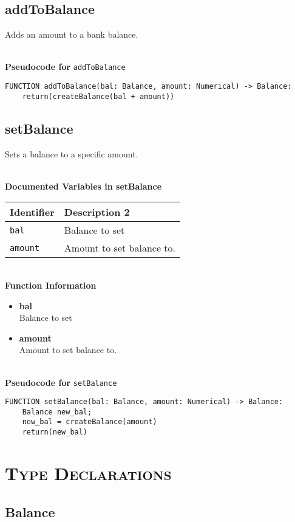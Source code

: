 \clearpage

\subsection{addToBalance}
Adds an amount to a bank balance.

\textbf{\\ Pseudocode for } \texttt{addToBalance}
\begin{verbatim}
FUNCTION addToBalance(bal: Balance, amount: Numerical) -> Balance:
	return(createBalance(bal + amount))
\end{verbatim}

\clearpage

\subsection{setBalance}
Sets a balance to a specific amount.

\textbf{ \\ Documented Variables in setBalance}
\begin{table}[htbp]
	\centering
	\begin{tabular}{|l|l|}
		\hline
		Identifier & Description 2 \\
		\hline
		 \texttt{bal} & Balance to set \\
		\hline
		 \texttt{amount} & Amount to set balance to. \\
		\hline
	\end{tabular}
\end{table}
\textbf{ \\ Function Information}
\begin{itemize}
	\setlength{\itemsep}{0pt}
	\setlength{\parskip}{0pt}
	\setlength{\parsep}{0pt}
	\item \textbf{bal} \\ Balance to set
	\item \textbf{amount} \\ Amount to set balance to.
\end{itemize}

\textbf{\\ Pseudocode for } \texttt{setBalance}
\begin{verbatim}
FUNCTION setBalance(bal: Balance, amount: Numerical) -> Balance:
	Balance new_bal;
	new_bal = createBalance(amount)
	return(new_bal)
\end{verbatim}


\section{\textsc{Type Declarations}}

\subsection{Balance}
